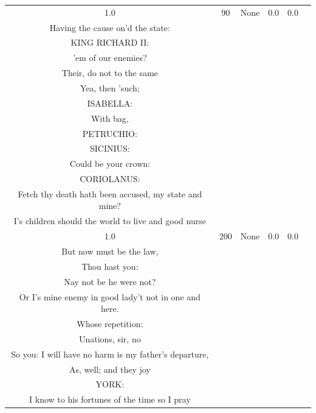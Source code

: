 \documentclass[11pt]{book}
\theoremstyle{plain}
\theoremstyle{definition}
\begin{document}
\begin{longtable}{ccccc >{\raggedright\arraybackslash}p{8cm}}
    1.0 & 90 & None & 0.0 & 0.0 &
    \begin{tcolorbox}[breakable, enhanced jigsaw, frame hidden, colback=white, boxrule=0pt]
    KING RICHARD:\\
    Having the cause on'd the state:\\
    KING RICHARD II:\\
    'em of our enemies?\\
    Their, do not to the same\\
    Yea, then 'such;\\
    ISABELLA:\\
    With bag,\\
    PETRUCHIO:\\
    SICINIUS:\\
    Could be your crown:\\
    CORIOLANUS:\\
    Fetch thy death hath been accused, my state and mine?\\
    I's children should the world to live and good nurse
    \end{tcolorbox} \\
    
    1.0 & 200 & None & 0.0 & 0.0 &
    \begin{tcolorbox}[breakable, enhanced jigsaw, frame hidden, colback=white, boxrule=0pt]
    KING RICHARD:\\
    But now must be the law,\\
    Thou hast you:\\
    Nay not be he were not?\\
    Or I's mine enemy in good lady't not in one and here.\\
    Whose repetition:\\
    Unations, sir, no\\
    So you: I will have no harm is my father's departure,\\
    As, well; and they joy\\
    YORK:\\
    I know to his fortunes of the time so I pray
    \end{tcolorbox} \\
    

\end{longtable}
\end{document}
